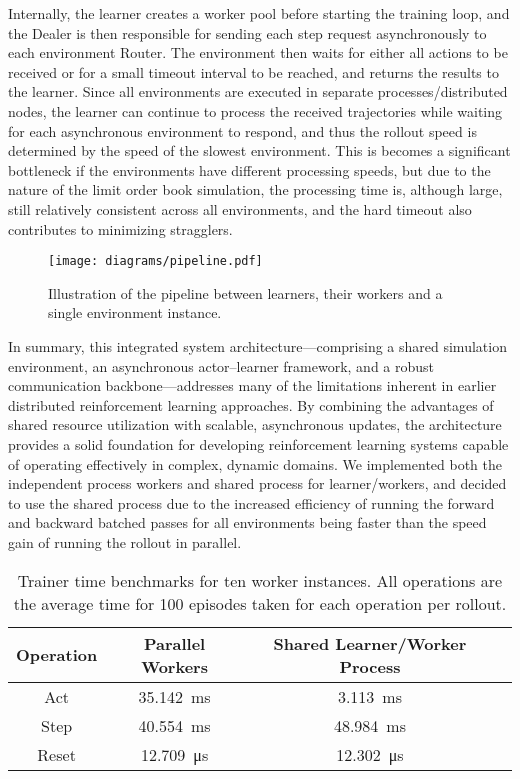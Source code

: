 \documentclass[11pt]{article}
\begin{document}
    Internally, the learner creates a worker pool before starting the training loop, and the Dealer is then responsible
    for sending each step request asynchronously to each environment Router.
    The environment then waits for either all actions to be received or for a small timeout interval to be reached,
    and returns the results to the learner.
    Since all environments are executed in separate processes/distributed nodes, the learner can continue to process the
    received trajectories while waiting for each asynchronous environment to respond,
    and thus the rollout speed is determined by the speed of the slowest environment.
    This is becomes a significant bottleneck if the environments have different processing speeds,
    but due to the nature of the limit order book simulation, the processing time is, although large,
    still relatively consistent across all environments, and the hard timeout also contributes to minimizing stragglers.

    \begin{figure}
        \centering
        \texttt{[image: diagrams/pipeline.pdf]}
        \caption{Illustration of the pipeline between learners, their workers and a single environment instance.}
        \label{fig:lob_simulation}
    \end{figure}

    In summary, this integrated system architecture—comprising a shared simulation environment, an asynchronous actor–learner framework, and
    a robust communication backbone—addresses many of the limitations inherent in earlier distributed reinforcement learning approaches.
    By combining the advantages of shared resource utilization with scalable, asynchronous updates, the architecture provides a solid foundation for
    developing reinforcement learning systems capable of operating effectively in complex, dynamic domains.
    We implemented both the independent process workers and shared process for learner/workers,
    and decided to use the shared process due to the increased efficiency of running the forward and backward batched passes
    for all environments being faster than the speed gain of running the rollout in parallel.

    \begin{table}[h!]
        \centering
        \begin{tabular}{|c|c|c|c|}
            \hline
            \textbf{Operation} & \textbf{Parallel Workers} & \textbf{Shared Learner/Worker Process} \\
            \hline

            Act & \SI{35.142}{\milli\second} & \SI{3.113}{\milli\second} \\
            Step & \SI{40.554}{\milli\second} &\SI{48.984}{\milli\second} \\
            Reset & \SI{12.709}{\micro\second} & \SI{12.302}{\micro\second} \\
            \hline
        \end{tabular}
        \caption{Trainer time benchmarks for ten worker instances. All operations are the average time for 100 episodes taken for each operation per rollout.}
        \label{tab:table}
    \end{table}
\end{document}
